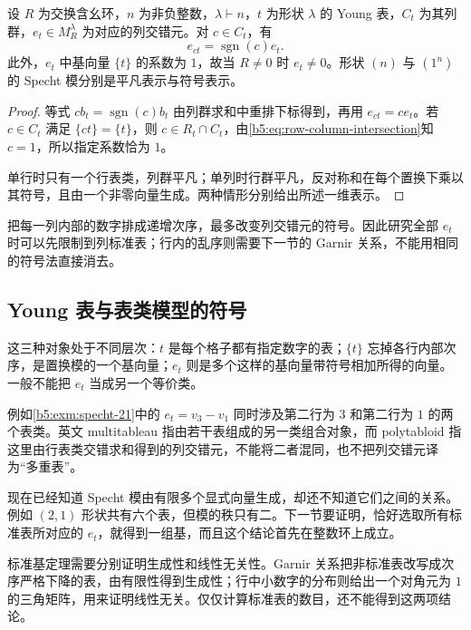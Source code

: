 \begin{proposition}\label{b5:prop:specht-column-sign}
	设 \(R\) 为交换含幺环，\(n\) 为非负整数，\(\lambda\vdash n\)，\(t\) 为形状 \(\lambda\) 的 Young 表，\(C_t\) 为其列群，\(e_t\in M_R^\lambda\) 为对应的列交错元。对 \(c\in C_t\)，有
	\[
		e_{ct}=\operatorname{sgn}(c)e_t.
	\]
	此外，\(e_t\) 中基向量 \(\{t\}\) 的系数为 \(1\)，故当 \(R\ne0\) 时 \(e_t\ne0\)。形状 \((n)\) 与 \((1^n)\) 的 Specht 模分别是平凡表示与符号表示。
\end{proposition}
\begin{proof}
	等式 \(cb_t=\operatorname{sgn}(c)b_t\) 由列群求和中重排下标得到，再用 \(e_{ct}=ce_t\)。若 \(c\in C_t\) 满足 \(\{ct\}=\{t\}\)，则 \(c\in R_t\cap C_t\)，由\eqref{b5:eq:row-column-intersection}知 \(c=1\)，所以指定系数恰为 \(1\)。

	单行时只有一个行表类，列群平凡；单列时行群平凡，反对称和在每个置换下乘以其符号，且由一个非零向量生成。两种情形分别给出所述一维表示。
\end{proof}

把每一列内部的数字排成递增次序，最多改变列交错元的符号。因此研究全部 \(e_t\) 时可以先限制到列标准表；行内的乱序则需要下一节的 Garnir 关系，不能用相同的符号法直接消去。

\subsection{Young 表与表类模型的符号}
\label{b5:subsec:0602:04}

这三种对象处于不同层次：\(t\) 是每个格子都有指定数字的表；\(\{t\}\) 忘掉各行内部次序，是置换模的一个基向量；\(e_t\) 则是多个这样的基向量带符号相加所得的向量。一般不能把 \(e_t\) 当成另一个等价类。

\ProseParagraphBreak

例如\cref{b5:exm:specht-21}中的 \(e_t=v_3-v_1\) 同时涉及第二行为 \(3\) 和第二行为 \(1\) 的两个表类。英文 multitableau 指由若干表组成的另一类组合对象，而 polytabloid 指这里由行表类交错求和得到的列交错元，不能将二者混同，也不把列交错元译为“多重表”。

现在已经知道 Specht 模由有限多个显式向量生成，却还不知道它们之间的关系。例如 \((2,1)\) 形状共有六个表，但模的秩只有二。下一节要证明，恰好选取所有标准表所对应的 \(e_t\)，就得到一组基，而且这个结论首先在整数环上成立。

\ProseParagraphBreak

标准基定理需要分别证明生成性和线性无关性。Garnir 关系把非标准表改写成次序严格下降的表，由有限性得到生成性；行中小数字的分布则给出一个对角元为 \(1\) 的三角矩阵，用来证明线性无关。仅仅计算标准表的数目，还不能得到这两项结论。
